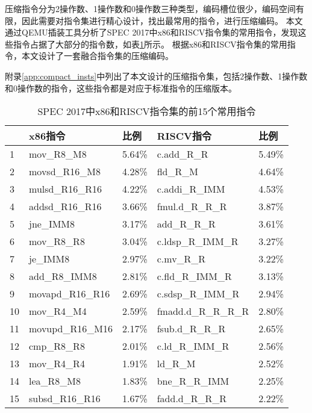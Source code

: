 压缩指令分为2操作数、1操作数和0操作数三种类型，编码槽位很少，编码空间有限，因此需要对指令集进行精心设计，找出最常用的指令，进行压缩编码。
本文通过QEMU插装工具分析了SPEC 2017中x86和RISCV指令集的常用指令，发现这些指令占据了大部分的指令数，如表\ref{tab:spec_insts}所示。
根据x86和RISCV指令集的常用指令，本文设计了一套融合指令集的压缩编码。

附录\ref{app:compact_insts}中列出了本文设计的压缩指令集，包括2操作数、1操作数和0操作数的指令，这些指令都是对应于标准指令的压缩版本。

\begin{table}[]
  \centering
  \caption{SPEC 2017中x86和RISCV指令集的前15个常用指令}
  \label{tab:spec_insts}
  \begin{tabular}{l|ll|ll}
     & x86指令            & 比例     & RISCV指令             & 比例     \\ \hline
  1  & mov\_R8\_M8      & 5.64\% & c.add\_R\_R         & 5.49\% \\
  2  & movsd\_R16\_M8   & 4.28\% & fld\_R\_M           & 4.64\% \\
  3  & mulsd\_R16\_R16  & 4.22\% & c.addi\_R\_IMM      & 4.53\% \\
  4  & addsd\_R16\_R16  & 3.66\% & fmul.d\_R\_R\_R     & 3.87\% \\
  5  & jne\_IMM8        & 3.17\% & add\_R\_R\_R        & 3.61\% \\
  6  & mov\_R8\_R8      & 3.04\% & c.ldsp\_R\_IMM\_R   & 3.27\% \\
  7  & je\_IMM8         & 2.97\% & c.mv\_R\_R          & 3.22\% \\
  8  & add\_R8\_IMM8    & 2.81\% & c.fld\_R\_IMM\_R    & 3.13\% \\
  9  & movapd\_R16\_R16 & 2.69\% & c.sdsp\_R\_IMM\_R   & 2.94\% \\
  10 & mov\_R4\_M4      & 2.59\% & fmadd.d\_R\_R\_R\_R & 2.80\% \\
  11 & movupd\_R16\_M16 & 2.17\% & fsub.d\_R\_R\_R     & 2.65\% \\
  12 & cmp\_R8\_R8      & 2.01\% & c.ld\_R\_IMM\_R     & 2.56\% \\
  13 & mov\_R4\_R4      & 1.91\% & ld\_R\_M            & 2.52\% \\
  14 & lea\_R8\_M8      & 1.83\% & bne\_R\_R\_IMM      & 2.25\% \\
  15 & subsd\_R16\_R16  & 1.67\% & fadd.d\_R\_R\_R     & 2.22\% \\
  \end{tabular}
  \end{table}


